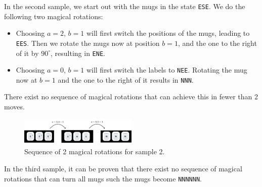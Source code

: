 \noindent
In the second sample, we start out with the mugs in the state \texttt{ESE}. We do the following two magical rotations:
\begin{itemize}
  \item Choosing $a = 2$, $b = 1$ will first switch the positions of the mugs, leading to \texttt{EES}. Then we rotate the mugs now at position $b = 1$, and the one to the right of it by $90^\circ$, resulting in \texttt{ENE}.
  \item Choosing $a = 0$, $b = 1$ will first switch the labels to \texttt{NEE}. Rotating the mug now at $b = 1$ and the one to the right of it results in \texttt{NNN}.
\end{itemize}
There exist no sequence of magical rotations that can achieve this in fewer than 2 moves.
\begin{figure}[h!]
  \centering
  \includegraphics[width=0.5\textwidth]{sample2.png}
  \caption{Sequence of 2 magical rotations for sample 2.}
\end{figure}


\noindent
In the third sample, it can be proven that there exist no sequence of magical rotations that can turn all mugs such the mugs become \texttt{NNNNNN}. 